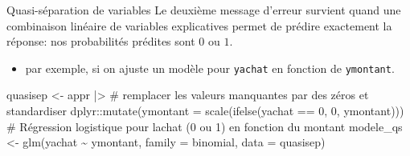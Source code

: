 \documentclass[
  ignorenonframetext,
]{beamer}
\newenvironment{Shaded}{\begin{snugshade}}{\end{snugshade}}
\newcommand{\AttributeTok}[1]{\textcolor[rgb]{0.40,0.45,0.13}{#1}}
\newcommand{\CommentTok}[1]{\textcolor[rgb]{0.37,0.37,0.37}{#1}}
\newcommand{\DecValTok}[1]{\textcolor[rgb]{0.68,0.00,0.00}{#1}}
\newcommand{\FunctionTok}[1]{\textcolor[rgb]{0.28,0.35,0.67}{#1}}
\newcommand{\NormalTok}[1]{\textcolor[rgb]{0.00,0.23,0.31}{#1}}
\newcommand{\OtherTok}[1]{\textcolor[rgb]{0.00,0.23,0.31}{#1}}
\newcommand{\SpecialCharTok}[1]{\textcolor[rgb]{0.37,0.37,0.37}{#1}}
\providecommand{\tightlist}{%
  \setlength{\itemsep}{0pt}\setlength{\parskip}{0pt}}\usepackage{longtable,booktabs,array}
\begin{document}
\begin{frame}[fragile]{Quasi-séparation de variables}
\protect\hypertarget{quasi-suxe9paration-de-variables}{}
Le deuxième message d'erreur survient quand une combinaison linéaire de
variables explicatives permet de prédire exactement la réponse: nos
probabilités prédites sont \(0\) ou \(1\).

\begin{itemize}
\tightlist
\item
  par exemple, si on ajuste un modèle pour \texttt{yachat} en fonction
  de \texttt{ymontant}.
\end{itemize}

\footnotesize

\begin{Shaded}
\begin{Highlighting}[numbers=left,,]
\NormalTok{quasisep }\OtherTok{\textless{}{-}}\NormalTok{ appr }\SpecialCharTok{|\textgreater{}}  
  \CommentTok{\# remplacer les valeurs manquantes par des zéros et standardiser}
\NormalTok{  dplyr}\SpecialCharTok{::}\FunctionTok{mutate}\NormalTok{(}\AttributeTok{ymontant =} \FunctionTok{scale}\NormalTok{(}\FunctionTok{ifelse}\NormalTok{(yachat }\SpecialCharTok{==} \DecValTok{0}\NormalTok{, }\DecValTok{0}\NormalTok{, ymontant)))}
\CommentTok{\# Régression logistique pour l\textquotesingle{}achat (0 ou 1) en fonction du montant}
\NormalTok{modele\_qs }\OtherTok{\textless{}{-}} \FunctionTok{glm}\NormalTok{(yachat }\SpecialCharTok{\textasciitilde{}}\NormalTok{ ymontant, }
              \AttributeTok{family =}\NormalTok{ binomial, }
              \AttributeTok{data =}\NormalTok{ quasisep)}
\end{Highlighting}
\end{Shaded}

\normalsize
\end{frame}
\end{document}

